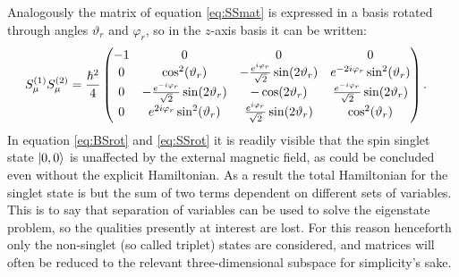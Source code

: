 \documentclass[a4paper]{article}
\begin{document}
Analogously the matrix of equation \ref{eq:SSmat} is expressed in a basis rotated through
angles \(\vartheta_r\) and \(\varphi_r\), so in the \(z\)-axis basis it can be written:
\begin{align}\label{eq:SSrot}
        S^{(1)}_\mu S^{(2)}_\mu &= \frac{\hbar{}^2}{4}\pmqty{-1 & 0 & 0 & 0\\
                0 & \cos[2](\vartheta_r) & -\frac{e^{i\varphi_r}}{\sqrt{2}
                }\sin(2\vartheta_r) & e^{-2i\varphi_r}\sin[2](\vartheta_r)\\
                0 & -\frac{e^{-i\varphi_r}}{\sqrt{2}
                }\sin(2\vartheta_r) & -\cos(2\vartheta_r) & \frac{e^{-i\varphi_r}}{\sqrt{2}
        }\sin(2\vartheta_r)\\
        0 & e^{2i\varphi_r}\sin[2](\vartheta_r) & \frac{e^{i\varphi_r}}{\sqrt{2}
        }\sin(2\vartheta_r) & \cos[2](\vartheta_r)}
.\end{align}
In equation \ref{eq:BSrot} and \ref{eq:SSrot} it is readily visible that the spin singlet state \(\ket{0, 0}\) is unaffected by
the external magnetic field, as could be concluded even without the explicit Hamiltonian.
As a result the total Hamiltonian for the singlet state is but the sum of two terms
dependent on different sets of variables. This is to say that separation of variables can
be used to solve the eigenstate problem, so the qualities presently at interest are lost.
For this reason henceforth only the non-singlet (so called triplet) states are considered,
and matrices will often be reduced to the relevant three-dimensional subspace for
simplicity's sake.
\end{document}
